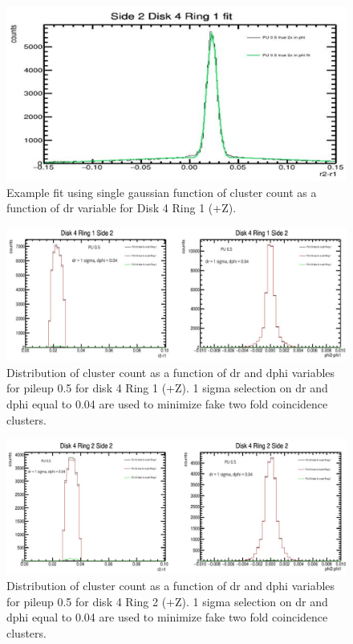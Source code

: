 \begin{figure}[!htp]
\centering
\includegraphics[width=1\textwidth]{ashish_thesis/D4R1S2_fit.png}
\caption{%
   Example fit using single gaussian function of cluster count as a function of dr variable for Disk 4 Ring 1 (+Z).
}
\label{fig:cluster_ring}
\end{figure}


\begin{figure}[!htp]
\centering
\includegraphics[width=1\textwidth]{ashish_thesis/D4R1S2_dr_dphi_cut.png}
\caption{%
 Distribution of cluster count as a function of dr and dphi variables for pileup 0.5 for disk 4 Ring 1 (+Z). 1 sigma selection on dr and dphi equal to 0.04 are used to minimize fake two fold coincidence clusters.
}
\label{fig:cluster_ring}
\end{figure}



\begin{figure}[!htp]
\centering
\includegraphics[width=1\textwidth]{ashish_thesis/D4R2S2_dr_dphi_cut.png}
\caption{%
   Distribution of cluster count as a function of dr and dphi variables for pileup 0.5 for disk 4 Ring 2 (+Z). 1 sigma selection on dr and dphi equal to 0.04 are used to minimize fake two fold coincidence clusters.
}
\label{fig:cluster_ring}
\end{figure}


